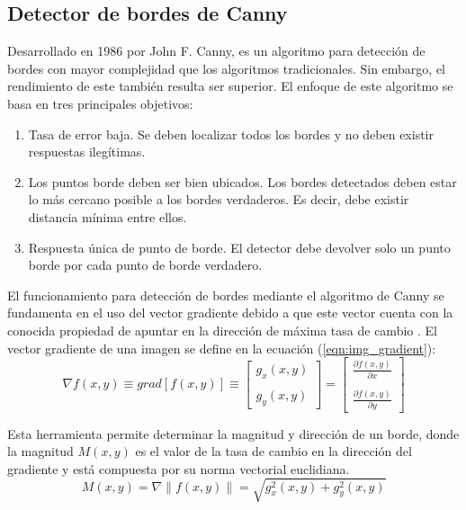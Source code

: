 \subsection{Detector de bordes de Canny} \label{sub:detector_de_bordes_de_canny}

Desarrollado en 1986 por John F. Canny, es un algoritmo para detección de bordes con mayor complejidad que los algoritmos tradicionales. Sin embargo, el rendimiento de este también resulta ser superior. El enfoque de este algoritmo se basa en tres principales objetivos:
\begin{enumerate}
    \item Tasa de error baja. Se deben localizar todos los bordes y no deben existir respuestas ilegítimas.
    \item Los puntos borde deben ser bien ubicados. Los bordes detectados deben estar lo más cercano posible a los bordes verdaderos. Es decir, debe existir distancia mínima entre ellos.
    \item Respuesta única de punto de borde. El detector debe devolver solo un punto borde por cada punto de borde verdadero. 
\end{enumerate}

El funcionamiento para detección de bordes mediante el algoritmo de Canny se fundamenta en el uso del vector gradiente debido a que este vector cuenta con la conocida propiedad de apuntar en la dirección de máxima tasa de cambio \cite{gonzalez2009digital}. El vector gradiente de una imagen se define en la ecuación (\ref{eqn:img_gradient}):
\begin{equation}
    \nabla f(x, y) \equiv grad[f(x, y)] \equiv \begin{bmatrix} 
        g_x(x, y) \\
        \\
        g_y(x, y) 
    \end{bmatrix}
    = 
    \begin{bmatrix} 
        \frac{\partial f(x, y)}{\partial x}\\
        \\
        \frac{\partial f(x, y)}{\partial y}
    \end{bmatrix}
    \label{eqn:img_gradient}
\end{equation}

Esta herramienta permite determinar la magnitud y dirección de un borde, donde la magnitud $M(x, y)$  es el valor de la tasa de cambio en la dirección del gradiente y está compuesta por su norma vectorial euclidiana.
\begin{equation}
    M(x, y) = \nabla \|f(x, y)\| = \sqrt{g_x^2(x, y) + g_y^2(x, y)}
\end{equation}

